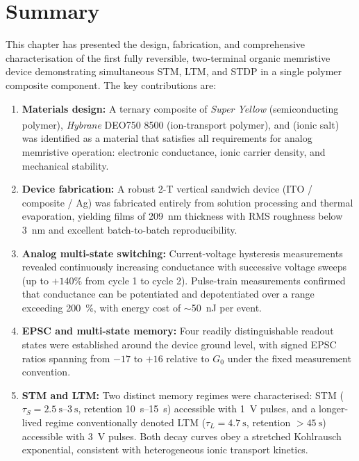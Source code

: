 \documentclass[12pt, a4paper, twoside]{report}
\newcommand{\SY}{\textit{Super Yellow}}
\newcommand{\Hybrane}{\textit{Hybrane}\textsuperscript{\textregistered} DEO750 8500}
\newcommand{\LiTf}{\ce{LiCF3SO3}}
\begin{document}
\section{Summary}\label{sec:ch2_summary}

This chapter has presented the design, fabrication, and comprehensive characterisation of the first fully reversible, two-terminal organic memristive device demonstrating simultaneous STM, LTM, and STDP in a single polymer composite component. The key contributions are:

\begin{enumerate}
  \item \textbf{Materials design:} A ternary composite of \SY{} (semiconducting polymer), \Hybrane{} (ion-transport polymer), and \LiTf{} (ionic salt) was identified as a material that satisfies all requirements for analog memristive operation: electronic conductance, ionic carrier density, and mechanical stability.

  \item \textbf{Device fabrication:} A robust 2-T vertical sandwich device (ITO / composite / Ag) was fabricated entirely from solution processing and thermal evaporation, yielding films of \SI{209}{\nano\metre} thickness with RMS roughness below \SI{3}{\nano\metre} and excellent batch-to-batch reproducibility.

  \item \textbf{Analog multi-state switching:} Current-voltage hysteresis measurements revealed continuously increasing conductance with successive voltage sweeps (up to $+140\%$ from cycle 1 to cycle 2). Pulse-train measurements confirmed that conductance can be potentiated and depotentiated over a range exceeding \SI{200}{\percent}, with energy cost of $\sim$\SI{50}{\nano\joule} per event.

  \item \textbf{EPSC and multi-state memory:} Four readily distinguishable readout states were established around the device ground level, with signed EPSC ratios spanning from $-17$ to $+16$ relative to $G_0$ under the fixed measurement convention.

  \item \textbf{STM and LTM:} Two distinct memory regimes were characterised: STM ($\tau_S = \SIrange{2.5}{3}{\second}$, retention \SIrange{10}{15}{\second}) accessible with \SI{1}{\volt} pulses, and a longer-lived regime conventionally denoted LTM ($\tau_L = \SI{4.7}{\second}$, retention $> \SI{45}{\second}$) accessible with \SI{3}{\volt} pulses. Both decay curves obey a stretched Kohlrausch exponential, consistent with heterogeneous ionic transport kinetics.


\end{enumerate}
\end{document}
